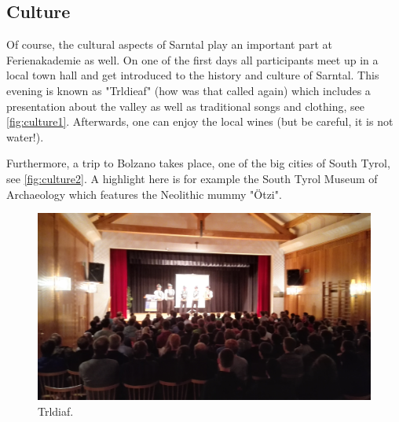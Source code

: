 \subsection{Culture}
Of course, the cultural aspects of Sarntal play an important part at Ferienakademie as well. On one of the first days all participants meet up in a local town hall and get introduced to the history and culture of Sarntal. This evening is known as "Trldieaf" (how was that called again) which includes a presentation about the valley as well as traditional songs and clothing, see \autoref{fig:culture1}. Afterwards, one can enjoy the local wines (but be careful, it is not water!). 

Furthermore, a trip to Bolzano takes place, one of the big cities of South Tyrol, see \autoref{fig:culture2}. A highlight here is for example the South Tyrol Museum of Archaeology which features the Neolithic mummy "Ötzi".
\begin{figure}[ht]%
 	\begin{center}%
 		\includegraphics[scale=0.045]{img/Culture1.jpg}%
 		\caption{Trldiaf.}\label{fig:culture1}%
 	\end{center}%
\end{figure} 
